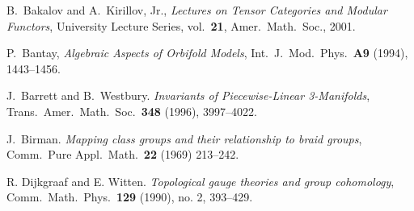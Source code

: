 \documentclass{ws-jktr}
\begin{document}
\begin{thebibliography}{0}



 B.\ Bakalov and A.\ Kirillov, Jr., {\em Lectures on
Tensor Categories and Modular Functors}, University Lecture Series,
vol.\ {\bf 21},  Amer.\ Math.\ Soc., 2001.

 P.\ Bantay, \emph{Algebraic Aspects of Orbifold Models}, Int.\ J.\ Mod.\ Phys.\ \textbf{A9} (1994), 1443--1456.

 J.\ Barrett and B.\ Westbury. {\em Invariants
of Piecewise-Linear 3-Manifolds}, Trans.\ Amer.\ Math.\ Soc.\ \textbf{348} (1996), 3997--4022.

 J.\ Birman. \emph{Mapping class groups and their relationship to braid groups}, Comm.\ Pure Appl.\ Math.\ \textbf{22} (1969) 213--242.





 R. Dijkgraaf and E. Witten. \emph{Topological gauge theories and group cohomology}, Comm.\ Math.\ Phys.\ \textbf{129} (1990), no. 2, 393--429.




\end{thebibliography}
\end{document}
